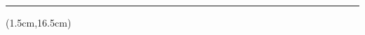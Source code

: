 \begin{titlepage}
\begin{textblock*}{18cm}
\begin{large}
            \makeatletter
            \@abstracttext
            \makeatother
            \par\noindent\rule{\textwidth\color{pniblue}}{0.4pt}
         \end{large}
    \end{textblock*}
    
    \begin{textblock*}{18cm}(1.5cm,16.5cm)
        \begin{large}
         \end{large}
    \end{textblock*}
    
    

\end{titlepage}
